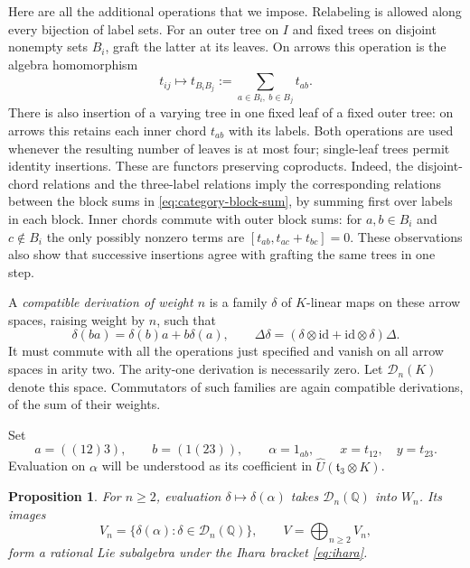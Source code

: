 \documentclass[11pt]{article}
\newcommand{\Q}{\mathbb Q}
\newcommand{\id}{\mathrm{id}}
\newtheorem{proposition}[theorem]{Proposition}
\theoremstyle{definition}
\theoremstyle{remark}
\numberwithin{equation}{section}
\begin{document}
Here are all the additional operations that we impose.  Relabeling is
allowed along every bijection of label sets.  For an outer tree on $I$
and fixed trees on disjoint nonempty sets $B_i$, graft the latter at its
leaves.  On arrows this operation is the algebra homomorphism
\begin{equation}\label{eq:category-block-sum}
 t_{ij}\longmapsto t_{B_iB_j}:=
 \sum_{a\in B_i,\ b\in B_j}t_{ab}.
\end{equation}
There is also insertion of a varying tree in one fixed leaf of a fixed
outer tree: on arrows this retains each inner chord $t_{ab}$ with its
labels.  Both operations are used whenever the resulting number of
leaves is at most four; single-leaf trees permit identity insertions.
These are functors preserving coproducts.  Indeed, the disjoint-chord
relations and the three-label relations imply the corresponding
relations between the block sums in
\eqref{eq:category-block-sum}, by summing first over labels in each
block.  Inner chords commute with outer block sums: for
$a,b\in B_i$ and $c\notin B_i$ the only possibly nonzero terms are
$[t_{ab},t_{ac}+t_{bc}]=0$.  These observations also show that successive
insertions agree with grafting the same trees in one step.

A \emph{compatible derivation of weight $n$} is a family $\delta$ of
$K$-linear maps on these arrow spaces, raising weight by $n$, such that
\[
 \delta(ba)=\delta(b)a+b\delta(a),\qquad
 \Delta\delta=(\delta\otimes\id+\id\otimes\delta)\Delta.
\]
It must commute with all the operations just specified and vanish on
all arrow spaces in arity two.  The arity-one derivation is necessarily
zero.  Let $\mathcal D_n(K)$ denote this space.  Commutators of such
families are again compatible derivations, of the sum of their weights.

Set
\[
 a=((12)3),\qquad b=(1(23)),\qquad
 \alpha=1_{ab},\qquad x=t_{12},\quad y=t_{23}.
\]
Evaluation on $\alpha$ will be understood as its coefficient in
$\widehat U(\mathfrak t_3\otimes K)$.

\begin{proposition}\label{prop:categorical-values}
For $n\geq2$, evaluation $\delta\mapsto\delta(\alpha)$ takes
$\mathcal D_n(\Q)$ into $W_n$.  Its images
\[
 V_n=\{\delta(\alpha):\delta\in\mathcal D_n(\Q)\},\qquad
 V=\bigoplus_{n\geq2}V_n,
\]
form a rational Lie subalgebra under the Ihara bracket \eqref{eq:ihara}.
\end{proposition}
\end{document}
